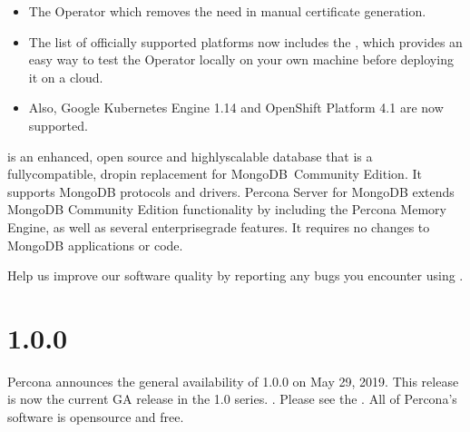 \documentclass[letterpaper,10pt,english]{sphinxmanual}
\begin{document}
\begin{itemize}
\item {} 
The Operator  which removes the need in manual certificate generation.

\item {} 
The list of officially supported platforms now includes the , which provides an easy way to test the Operator locally on your own machine before deploying it on a cloud.

\item {} 
Also, Google Kubernetes Engine 1.14 and OpenShift Platform 4.1 are now supported.

\end{itemize}

 is an enhanced, open source and highly\sphinxhyphen{}scalable database that is a fully\sphinxhyphen{}compatible, drop\sphinxhyphen{}in replacement for MongoDB Community Edition. It supports MongoDB protocols and drivers. Percona Server for MongoDB extends MongoDB Community Edition functionality by including the Percona Memory Engine, as well as several enterprise\sphinxhyphen{}grade features. It requires no changes to MongoDB applications or code.

Help us improve our software quality by reporting any bugs you encounter using .


\section{ 1.0.0}
\label{\detokenize{RN/Kubernetes-Operator-for-PSMONGODB-RN1.0.0:percona-kubernetes-operator-for-percona-server-for-mongodb-1-0-0}}\label{\detokenize{RN/Kubernetes-Operator-for-PSMONGODB-RN1.0.0::doc}}
Percona announces the general availability of  1.0.0 on May 29, 2019. This release is now the current GA release in the 1.0 series. . Please see the . All of Percona’s software is open\sphinxhyphen{}source and free.
\end{document}

